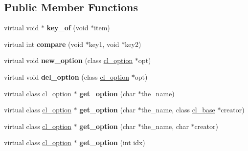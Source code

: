 \subsection*{Public Member Functions}
\begin{DoxyCompactItemize}
\item 
\hypertarget{classcl__options_afe9b229be92e3ddc519602cbafb087dc}{
virtual void $\ast$ {\bfseries key\_\-of} (void $\ast$item)}
\label{classcl__options_afe9b229be92e3ddc519602cbafb087dc}

\item 
\hypertarget{classcl__options_a30e9265492e08c86ebd15d032ba53cb5}{
virtual int {\bfseries compare} (void $\ast$key1, void $\ast$key2)}
\label{classcl__options_a30e9265492e08c86ebd15d032ba53cb5}

\item 
\hypertarget{classcl__options_a558bbdd448f06b5055c83c40400bb0b1}{
virtual void {\bfseries new\_\-option} (class \hyperlink{classcl__option}{cl\_\-option} $\ast$opt)}
\label{classcl__options_a558bbdd448f06b5055c83c40400bb0b1}

\item 
\hypertarget{classcl__options_acfd2a6d1424056903ce6c945f46871e8}{
virtual void {\bfseries del\_\-option} (class \hyperlink{classcl__option}{cl\_\-option} $\ast$opt)}
\label{classcl__options_acfd2a6d1424056903ce6c945f46871e8}

\item 
\hypertarget{classcl__options_a27b0bf51c5657f9ac8fa2acb2ec79ff2}{
virtual class \hyperlink{classcl__option}{cl\_\-option} $\ast$ {\bfseries get\_\-option} (char $\ast$the\_\-name)}
\label{classcl__options_a27b0bf51c5657f9ac8fa2acb2ec79ff2}

\item 
\hypertarget{classcl__options_ab7683f05307308b4f676474c3f547955}{
virtual class \hyperlink{classcl__option}{cl\_\-option} $\ast$ {\bfseries get\_\-option} (char $\ast$the\_\-name, class \hyperlink{classcl__base}{cl\_\-base} $\ast$creator)}
\label{classcl__options_ab7683f05307308b4f676474c3f547955}

\item 
\hypertarget{classcl__options_aebf3d2761d774685c51bf7e8de5d2f25}{
virtual class \hyperlink{classcl__option}{cl\_\-option} $\ast$ {\bfseries get\_\-option} (char $\ast$the\_\-name, char $\ast$creator)}
\label{classcl__options_aebf3d2761d774685c51bf7e8de5d2f25}

\item 
\hypertarget{classcl__options_a989e623395c0f7e3e9593db236380045}{
virtual class \hyperlink{classcl__option}{cl\_\-option} $\ast$ {\bfseries get\_\-option} (int idx)}
\label{classcl__options_a989e623395c0f7e3e9593db236380045}


\end{DoxyCompactItemize}
